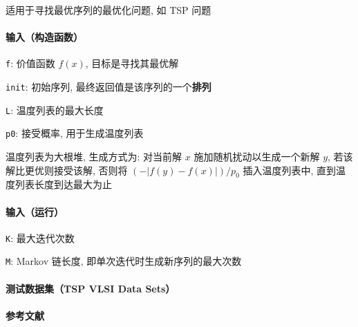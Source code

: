 适用于寻找最优序列的最优化问题, 如 TSP 问题

\paragraph{输入（构造函数）}

\verb|f|: 价值函数 \(f(x)\), 目标是寻找其最优解

\verb|init|: 初始序列, 最终返回值是该序列的一个\textbf{排列}

\verb|L|: 温度列表的最大长度

\verb|p0|: 接受概率, 用于生成温度列表

温度列表为大根堆, 生成方式为: 对当前解 \(x\) 施加随机扰动以生成一个新解 \(y\), 若该解比更优则接受该解, 否则将 \((-|f(y)-f(x)|)/p_0\) 插入温度列表中, 直到温度列表长度到达最大为止

\paragraph{输入（运行）}

\verb|K|: 最大迭代次数

\verb|M|: Markov 链长度, 即单次迭代时生成新序列的最大次数

\paragraph{测试数据集（TSP VLSI Data Sets）} \cite{tspvlsidatasets}

\paragraph{参考文献} \cite{zhan2016list}
